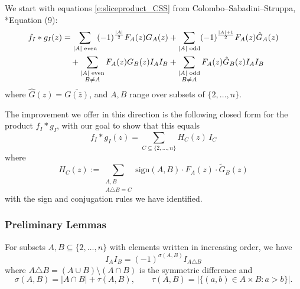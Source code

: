 \documentclass[11pt]{amsart}
\begin{document}
We start with equations \eqref{e:sliceproduct_CSS} from Colombo--Sabadini--Struppa, \cite{MR2684426}*{Equation (9)}:
\begin{align}
f_I * g_I(z) &= \sum_{|A| \text{ even}} (-1)^{\frac{|A|}{2}} F_A(z) G_A(z) + \sum_{|A| \text{ odd}} (-1)^{\frac{|A|+1}{2}} F_A(z) \hat{G}_A(z) \notag \\
&\quad + \sum_{\substack{|A| \text{ even} \\ B \neq A}} F_A(z) G_B(z) I_A I_B + \sum_{\substack{|A| \text{ odd} \\ B \neq A}} F_A(z) \hat{G}_B(z) I_A I_B
\end{align}
where $\hat{G}(z) = \overline{G(\bar{z})}$, and $A, B$ range over subsets of $\{2, \ldots, n\}$.

The improvement we offer in this direction is the following closed form for the product $f_I\ast g_I$, with our goal to show that this equals
\[
f_I * g_I(z) = \sum_{C \subseteq \{2,\ldots,n\}} H_C(z) \, I_C
\]
where
\[
H_C(z) := \sum_{\substack{A, B \\ A \triangle B = C}} \mathrm{sign}(A,B) \cdot F_A(z) \cdot \tilde{G}_B(z)
\]
with the sign and conjugation rules we have identified.

\subsubsection{Preliminary Lemmas}

\begin{lemma}
\label{lem:clifford}
For subsets $A, B \subseteq \{2, \ldots, n\}$ with elements written in increasing order, we have
\[
I_A I_B = (-1)^{\sigma(A,B)} I_{A \triangle B}
\]
where $A \triangle B = (A \cup B) \setminus (A \cap B)$ is the symmetric difference and
\[
\sigma(A, B) = |A \cap B| + \tau(A, B), \qquad \tau(A,B) = |\{(a,b) \in A \times B : a > b\}|.
\]
\end{lemma}
\end{document}
